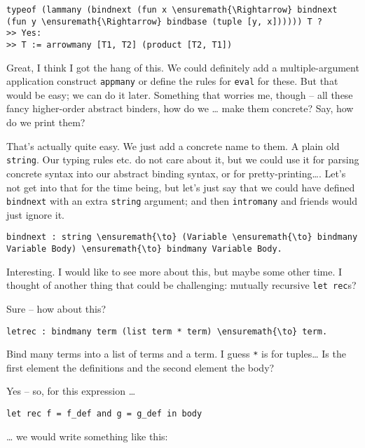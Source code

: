 \begin{verbatim}
typeof (lammany (bindnext (fun x \ensuremath{\Rightarrow} bindnext (fun y \ensuremath{\Rightarrow} bindbase (tuple [y, x]))))) T ?
>> Yes:
>> T := arrowmany [T1, T2] (product [T2, T1])
\end{verbatim}

\heroSTUDENT{} Great, I think I got the hang of this. We could definitely add
a multiple-argument application construct \texttt{appmany} or define the
rules for \texttt{eval} for these. But that would be easy; we can do it
later. Something that worries me, though -- all these fancy higher-order
abstract binders, how do we \ldots{} make them concrete? Say, how do we
print them?

\heroADVISOR{} That's actually quite easy. We just add a concrete name to
them. A plain old \texttt{string}. Our typing rules etc. do not care
about it, but we could use it for parsing concrete syntax into our
abstract binding syntax, or for pretty-printing\ldots{}. Let's not get
into that for the time being, but let's just say that we could have
defined \texttt{bindnext} with an extra \texttt{string} argument; and
then \texttt{intromany} and friends would just ignore it.

\begin{verbatim}
bindnext : string \ensuremath{\to} (Variable \ensuremath{\to} bindmany Variable Body) \ensuremath{\to} bindmany Variable Body.
\end{verbatim}

\heroSTUDENT{} Interesting. I would like to see more about this, but maybe
some other time. I thought of another thing that could be challenging:
mutually recursive \texttt{let\ rec}s?

\heroADVISOR{} Sure -- how about this?

\begin{verbatim}
letrec : bindmany term (list term * term) \ensuremath{\to} term.
\end{verbatim}

\heroSTUDENT{} Bind many terms into a list of terms and a term. I guess
\texttt{*} is for tuples\ldots{} Is the first element the definitions
and the second element the body?

\heroADVISOR{} Yes -- so, for this expression \ldots{}

\begin{verbatim}
let rec f = f_def and g = g_def in body
\end{verbatim}

\heroSTUDENT{} \ldots{} we would write something like this:


